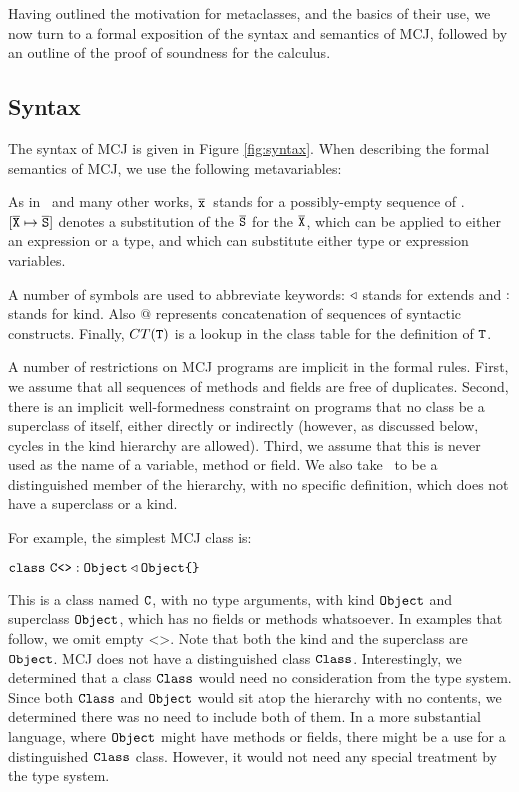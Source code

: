 \documentclass{acmconfbig}
\begin{document}
\label{formal}

Having outlined the motivation for metaclasses, and the basics of
their use, we now turn to a formal exposition of the syntax and
semantics of MCJ, followed by an outline of the proof of soundness for
the calculus.


\subsection{Syntax}
\label{Syntax}

\figSyntax

The syntax of MCJ is given in Figure \ref{fig:syntax}. When describing
the formal semantics of MCJ, we use the following metavariables:

\metavars

As in \FJ\ and many other works, ${\overline{{\mbox {\tt x}}}}$\ stands for a possibly-empty
sequence of \x.  $[{\overline {\mbox {\tt X}}} \mapsto {\overline {\mbox {\tt S}}}]$ denotes a substitution of the ${\overline{{\mbox {\tt S}}}}$ for the
${\overline{{\mbox {\tt X}}}}$, which can be applied to either an expression or a type, and
which can substitute either type or expression variables.

A number of symbols are used to abbreviate keywords: $\triangleleft$
stands for {\txt extends} and $:$ stands for {\txt kind}. Also
$@$ represents concatenation of sequences of syntactic constructs.
Finally, $CT(\mbox {\tt T})$ is a lookup in the class table for the definition of
$\mbox {\tt T}$.

A number of restrictions on MCJ programs are implicit in the formal
rules.  First, we assume that all sequences of methods and fields are
free of duplicates.  Second, there is an implicit well-formedness
constraint on programs that no class be a superclass of itself, either
directly or indirectly (however, as discussed below, cycles in the
kind hierarchy are allowed).  Third, we assume that {\txt this} is
never used as the name of a variable, method or field.  We also take
\Object\ to be a distinguished member of the hierarchy, with no
specific definition, which does not have a superclass or a kind.

For example, the simplest MCJ class is:

\vspace{.1cm}
$\mbox{\tt class}\ {\mbox {\tt C}}\mbox{\tt <}\mbox{\tt >} : \mbox{\tt Object} \triangleleft \mbox{\tt Object} \mbox{\tt \{}\mbox{\tt \}}$
\vspace{.1cm}

This is a class named $\mbox {\tt C}$, with no type arguments, with kind
$\mbox{\tt Object}$ and superclass $\mbox{\tt Object}$, which has no fields or methods
whatsoever.  In examples that follow, we omit empty {\txt <>}.  Note
that both the kind and the superclass are $\mbox{\tt Object}$.  MCJ does not
have a distinguished class $\mbox{\tt Class}$.  Interestingly, we determined
that a class $\mbox{\tt Class}$ would need no consideration from the type
system.  Since both $\mbox{\tt Class}$ and $\mbox{\tt Object}$ would sit atop the
hierarchy with no contents, we determined there was no need to include
both of them.  In a more substantial language, where $\mbox{\tt Object}$ might
have methods or fields, there might be a use for a distinguished
$\mbox{\tt Class}$ class.  However, it would not need any special treatment by
the type system.
\end{document}
